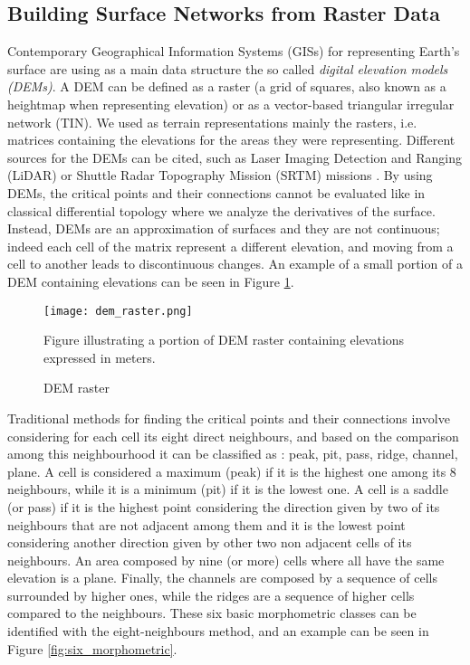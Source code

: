\subsection{Building Surface Networks from Raster Data}
Contemporary Geographical Information Systems (GISs) for representing Earth's surface are using as a main data structure the so called \textit{digital elevation models (DEMs)}. A DEM can be defined as a raster (a grid of squares, also known as a heightmap when representing elevation) or as a vector-based triangular irregular network (TIN). We used as terrain representations mainly the rasters, i.e. matrices  containing the elevations for the areas they were representing. Different sources for the DEMs can be cited, such as Laser Imaging Detection and Ranging (LiDAR) or Shuttle Radar Topography Mission (SRTM) missions \cite{Farr2007RGP}. By using DEMs, the critical points and their connections cannot be evaluated like in classical differential topology where we analyze the derivatives of the surface. Instead, DEMs are an approximation of surfaces and they are not continuous; indeed each cell of the matrix represent a different elevation, and moving from a cell to another leads to discontinuous changes. An example of a small portion of a DEM containing elevations can be seen in Figure \ref{fig:dem_raster}. 
\begin{figure} 
\centering
\texttt{[image: dem\_raster.png]}
\caption{DEM raster}
Figure illustrating a portion of DEM raster containing elevations expressed in meters.
\label{fig:dem_raster}
\end{figure}

Traditional methods for finding the critical points and their connections involve considering for each cell its eight direct neighbours, and based on the comparison among this neighbourhood it can be classified as : peak, pit, pass, ridge, channel, plane. A cell is considered a maximum (peak) if it is the highest one among its 8 neighbours, while it is a minimum (pit) if it is the lowest one. A cell is a saddle (or pass) if it is the highest point considering the direction given by two of its neighbours that are not adjacent among them and it is the lowest point considering another direction given by other two non adjacent cells of its neighbours. An area composed by nine (or more) cells where all have the same elevation is a plane. Finally, the channels are composed by a sequence of cells surrounded by higher ones, while the ridges are a sequence of higher cells compared to the neighbours. These six basic morphometric classes can be identified with the eight-neighbours method, and an example can be seen in Figure \ref{fig:six_morphometric}.

